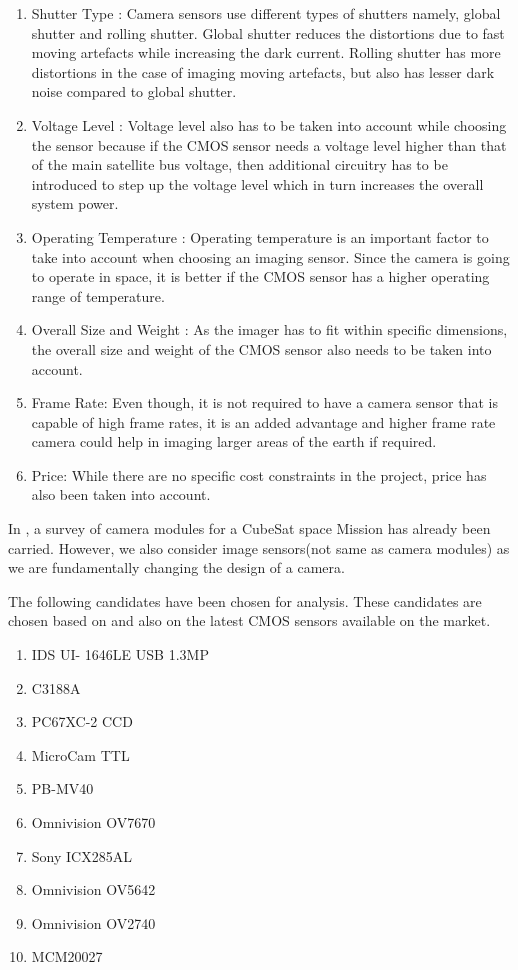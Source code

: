 \begin{enumerate}
\item Shutter Type : Camera sensors use different types of shutters namely, global shutter and rolling shutter. Global shutter reduces the distortions due to fast moving artefacts while increasing the dark current. Rolling shutter has more distortions in the case of imaging moving artefacts, but also has lesser dark noise compared to global shutter. 

\item Voltage Level : Voltage level also has to be taken into account while choosing the sensor because if the CMOS sensor needs a voltage level higher than that of the main satellite bus voltage, then additional circuitry has to be introduced to step up the voltage level which in turn increases the overall system power.  

\item Operating Temperature : Operating temperature is an important factor to take into account when choosing an imaging sensor. Since the camera is going to operate in space, it is better if the CMOS sensor has a higher operating range of temperature. 

\item Overall Size and Weight : As the imager has to fit within specific dimensions, the overall size and weight of the CMOS sensor also needs to be taken into account.

\item Frame Rate: Even though, it is not required to have a camera sensor that is capable of high frame rates, it is an added advantage and higher frame rate camera could help in imaging larger areas of the earth if required. 
\item Price: While there are no specific cost constraints in the project, price has also been taken into account.
\end{enumerate}

In \cite{surveyCamMod}, a survey of camera modules for a CubeSat space Mission has already been carried. However, we also consider image sensors(not same as camera modules) as we are fundamentally changing the design of a camera. 

The following candidates have been chosen for analysis. These candidates are chosen based on \cite{surveyCamMod} and also on the latest CMOS sensors available on the market. 
\begin{enumerate}[label=(\alph*)]
\item IDS UI- 1646LE USB 1.3MP
\item C3188A
\item PC67XC-2 CCD
\item MicroCam TTL
\item PB-MV40
\item Omnivision OV7670
\item Sony ICX285AL
\item Omnivision OV5642
\item Omnivision OV2740
\item MCM20027
\end{enumerate}

